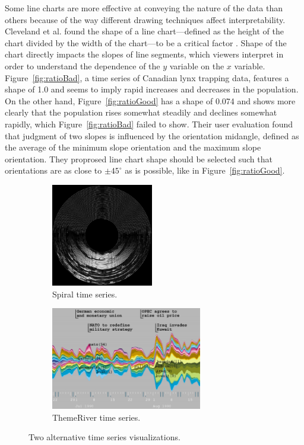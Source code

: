 Some line charts are more effective at conveying the nature of the data than others because of the way different drawing techniques affect interpretability.  Cleveland et al. found the shape of a line chart---defined as the height of the chart divided by the width of the chart---to be a critical factor \cite{cleveland1988}.   Shape of the chart directly impacts the slopes of line segments, which viewers interpret in order to understand the dependence of the $y$ variable on the $x$ variable.  Figure~\ref{fig:ratioBad}, a time series of Canadian lynx trapping data, features a shape of 1.0 and seems to imply rapid increases and decreases in the population.  On the other hand, Figure~\ref{fig:ratioGood} has a shape of 0.074 and shows more clearly that the population rises somewhat steadily and declines somewhat rapidly, which Figure~\ref{fig:ratioBad} failed to show.  Their user evaluation found that judgment of two slopes is influenced by the orientation midangle, defined as the average of the minimum slope orientation and the maximum slope orientation.  They proprosed line chart shape should be selected such that orientations are as close to $\pm 45 ^{\circ}$ as is possible, like in Figure~\ref{fig:ratioGood}.

\begin{figure}
\centering
	\begin{subfigure}[b]{0.45\textwidth}
		\centering
		\includegraphics[height=4.5cm]{figures/eps/spiral.eps}
		\caption{Spiral time series.}
		\label{fig:altSpiral}
	\end{subfigure}	
	\begin{subfigure}[b]{0.45\textwidth}
		\centering
		\includegraphics[height=4.5cm]{figures/eps/themeriver.eps}
		\caption{ThemeRiver time series.}
		\label{fig:altThemeriver}
	\end{subfigure}
	\caption{Two alternative time series visualizations.}
	\label{fig:tsAlternatives}
\end{figure}

